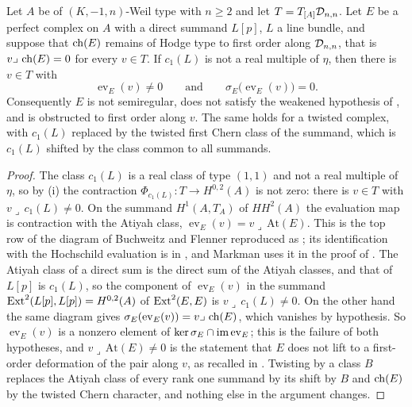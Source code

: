\begin{theorem}
\label{thm:linebundle}
Let $A$ be of $(K,-1,n)$-Weil type with $n\ge2$ and let $T=T_{[A]}\mathcal{D}_{n,n}$.
Let $E$ be a perfect complex on $A$ with a direct summand $L[p]$, $L$ a line
bundle, and suppose that $\operatorname{ch}(E)$ remains of Hodge type to first order along
$\mathcal{D}_{n,n}$, that is $v\lrcorner\,\operatorname{ch}(E)=0$ for every $v\in T$. If $c_{1}(L)$
is not a real multiple of $\eta$, then there is $v\in T$ with
\[
  \operatorname{ev}_{E}(v)\ne0
  \qquad\text{and}\qquad
  \sigma_{E}\bigl(\operatorname{ev}_{E}(v)\bigr)=0 .
\]
Consequently $E$ is not semiregular, does not satisfy the weakened hypothesis
of \cite[Question 11.4]{Mar25b}, and is obstructed to first order along $v$.
The same holds for a twisted complex, with $c_{1}(L)$ replaced by the twisted
first Chern class of the summand, which is $c_{1}(L)$ shifted by the class
common to all summands.
\end{theorem}

\begin{proof}
The class $c_{1}(L)$ is a real class of type $(1,1)$ and not a real multiple
of $\eta$, so by (i) the contraction
$\Phi_{c_{1}(L)}\colon T\to H^{0,2}(A)$ is not zero: there is $v\in T$ with
$v\lrcorner\,c_{1}(L)\ne0$. On the summand $H^{1}(A,T_{A})$ of $HH^{2}(A)$ the
evaluation map is contraction with the Atiyah class,
$\operatorname{ev}_{E}(v)=v\lrcorner\,\mathrm{At}(E)$. This is the top row of
the diagram of Buchweitz and Flenner reproduced as \cite[(2.1)]{Mar25b}; its
identification with the Hochschild evaluation is in \cite{BF08}, and Markman
uses it in the proof of \cite[Lemma~11.3]{Mar25b}. The Atiyah class of a
direct sum is the direct sum of the Atiyah classes, and that of $L[p]$ is
$c_{1}(L)$, so the
component of $\operatorname{ev}_{E}(v)$ in the summand
$\operatorname{Ext}^{2}(L[p],L[p])=H^{0,2}(A)$ of $\operatorname{Ext}^{2}(E,E)$ is
$v\lrcorner\,c_{1}(L)\ne0$. On the other hand the same diagram gives
$\sigma_{E}(\operatorname{ev}_{E}(v))=v\lrcorner\,\operatorname{ch}(E)$, which vanishes by
hypothesis. So $\operatorname{ev}_{E}(v)$ is a nonzero element of
$\ker\sigma_{E}\cap\operatorname{im}\operatorname{ev}_{E}$; this is the failure of both
hypotheses, and $v\lrcorner\,\mathrm{At}(E)\ne0$ is the statement that $E$
does not lift to a first-order deformation of the pair along $v$, as recalled
in \cite[Section 2]{Mar25b}. Twisting by a class $B$ replaces the Atiyah
class of every rank one summand by its shift by $B$ and $\operatorname{ch}(E)$ by the
twisted Chern character, and nothing else in the argument changes.
\end{proof}

